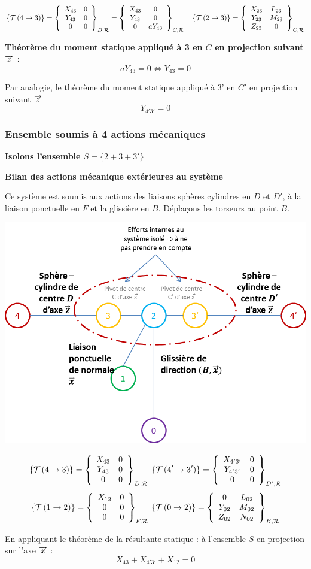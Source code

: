 \documentclass[10pt]{article}
\begin{document}
$$
\torseurstat{T}{4}{3} 
= \torseurcol{X_{43}}{Y_{43}}{0}{0}{0}{0}{D,\mathcal{R}}
= \torseurcol{X_{43}}{Y_{43}}{0}{0}{0}{aY_{43}}{C,\mathcal{R}}
\quad
\torseurstat{T}{2}{3} 
= \torseurcol{X_{23}}{Y_{23}}{Z_{23}}{L_{23}}{M_{23}}{0}{C,\mathcal{R}}
$$

\textbf{Théorème du moment statique appliqué à 3 en $C$ en projection suivant $\vect{z}$ :}
$$
aY_{43}=0 \Longleftrightarrow Y_{43}=0
$$

Par analogie, le théorème du moment statique appliqué à 3' en $C'$ en projection suivant $\vect{z}$ 
$$
Y_{4'3'}=0
$$

\subsubsection*{Ensemble soumis à 4 actions mécaniques}
\textbf{Isolons l'ensemble $S=\{ 2+3+3'\}$}

\textbf{Bilan des actions mécanique extérieures au système}

Ce système est soumis aux actions des liaisons sphères cylindres en $D$ et $D'$, à la liaison ponctuelle en $F$ et la glissière en $B$. Déplaçons les torseurs au point $B$.

\begin{center}
\includegraphics[width=.75\textwidth]{images/E}
\end{center}
$$
\torseurstat{T}{4}{3} 
= \torseurcol{X_{43}}{Y_{43}}{0}{0}{0}{0}{D,\mathcal{R}}
\;
\torseurstat{T}{4'}{3'} 
= \torseurcol{X_{4'3'}}{Y_{4'3'}}{0}{0}{0}{0}{D',\mathcal{R}}
$$
$$
\torseurstat{T}{1}{2} 
= \torseurcol{X_{12}}{0}{0}{0}{0}{0}{F,\mathcal{R}}
\;
\torseurstat{T}{0}{2} =
\torseurcol{0}{Y_{02}}{Z_{02}}{L_{02}}{M_{02}}{N_{02}}{B,\mathcal{R}}
$$

En appliquant le théorème de la résultante statique : à l'ensemble $S$ en projection sur l'axe $\vect{x}$ :
$$
X_{43}+X_{4'3'}+X_{12}=0
$$
\end{document}
